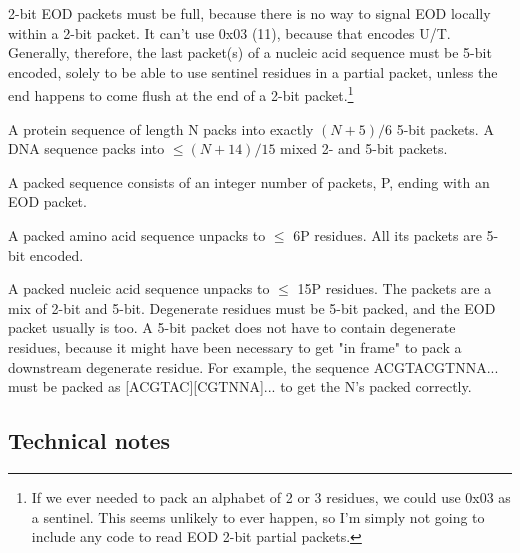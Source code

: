 2-bit EOD packets must be full, because there is no way to signal EOD
locally within a 2-bit packet. It can't use 0x03 (11), because that
encodes U/T. Generally, therefore, the last packet(s) of a nucleic
acid sequence must be 5-bit encoded, solely to be able to use sentinel
residues in a partial packet, unless the end happens to come flush at
the end of a 2-bit packet.\footnote{If we ever needed to pack an
  alphabet of 2 or 3 residues, we could use 0x03 as a sentinel.  This
  seems unlikely to ever happen, so I'm simply not going to include
  any code to read EOD 2-bit partial packets.}

A protein sequence of length N packs into exactly $(N+5)/6$ 5-bit
packets. A DNA sequence packs into $\leq (N+14)/15$ mixed 2- and 5-bit
packets.

A packed sequence consists of an integer number of packets, P, ending
with an EOD packet.
 
A packed amino acid sequence unpacks to $\leq$ 6P residues. All its
packets are 5-bit encoded.
 
A packed nucleic acid sequence unpacks to $\leq$ 15P residues.  The
packets are a mix of 2-bit and 5-bit. Degenerate residues must be
5-bit packed, and the EOD packet usually is too. A 5-bit packet does
not have to contain degenerate residues, because it might have been
necessary to get "in frame" to pack a downstream degenerate
residue. For example, the sequence ACGTACGTNNA... must be packed as
[ACGTAC][CGTNNA]... to get the N's packed correctly.
 

\subsection{Technical notes}

